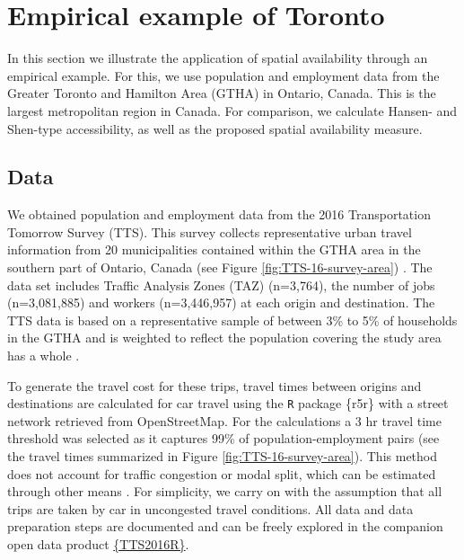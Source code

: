 \documentclass[]{elsarticle} %
\begin{document}
\hypertarget{empirical-example-of-toronto}{%
\section{Empirical example of
Toronto}\label{empirical-example-of-toronto}}

In this section we illustrate the application of spatial availability
through an empirical example. For this, we use population and employment
data from the Greater Toronto and Hamilton Area (GTHA) in Ontario,
Canada. This is the largest metropolitan region in Canada. For
comparison, we calculate Hansen- and Shen-type accessibility, as well as
the proposed spatial availability measure.

\hypertarget{data}{%
\subsection{Data}\label{data}}

We obtained population and employment data from the 2016 Transportation
Tomorrow Survey (TTS). This survey collects representative urban travel
information from 20 municipalities contained within the GTHA area in the
southern part of Ontario, Canada (see Figure
\ref{fig:TTS-16-survey-area}) \citep{data_management_group_tts_2018}.
The data set includes Traffic Analysis Zones (TAZ) (n=3,764), the number
of jobs (n=3,081,885) and workers (n=3,446,957) at each origin and
destination. The TTS data is based on a representative sample of between
3\% to 5\% of households in the GTHA and is weighted to reflect the
population covering the study area has a whole
\citep{data_management_group_tts_2018}.

To generate the travel cost for these trips, travel times between
origins and destinations are calculated for car travel using the
\texttt{R} package \{r5r\} \citep{r5r_2021} with a street network
retrieved from OpenStreetMap. For the calculations a 3 hr travel time
threshold was selected as it captures 99\% of population-employment
pairs (see the travel times summarized in Figure
\ref{fig:TTS-16-survey-area}). This method does not account for traffic
congestion or modal split, which can be estimated through other means
\citep[e.g.,][]{allen_suburbanization_2021, higgins2021changes}. For
simplicity, we carry on with the assumption that all trips are taken by
car in uncongested travel conditions. All data and data preparation
steps are documented and can be freely explored in the companion open
data product \href{https://soukhova.github.io/TTS2016R/}{\{TTS2016R\}}.
\end{document}
